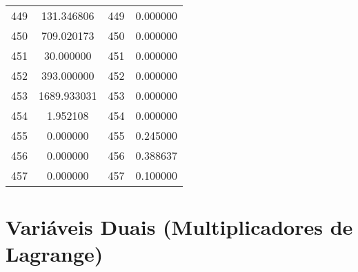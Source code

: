\documentclass[12pt]{article}
\begin{document}
\begin{longtable}{@{}cccc@{}}
449 & 131.346806 & 449 & 0.000000 \\
450 & 709.020173 & 450 & 0.000000 \\
451 & 30.000000 & 451 & 0.000000 \\
452 & 393.000000 & 452 & 0.000000 \\
453 & 1689.933031 & 453 & 0.000000 \\
454 & 1.952108 & 454 & 0.000000 \\
455 & 0.000000 & 455 & 0.245000 \\
456 & 0.000000 & 456 & 0.388637 \\
457 & 0.000000 & 457 & 0.100000 \\

\end{longtable}

\section{Variáveis Duais (Multiplicadores de Lagrange)}
\end{document}
